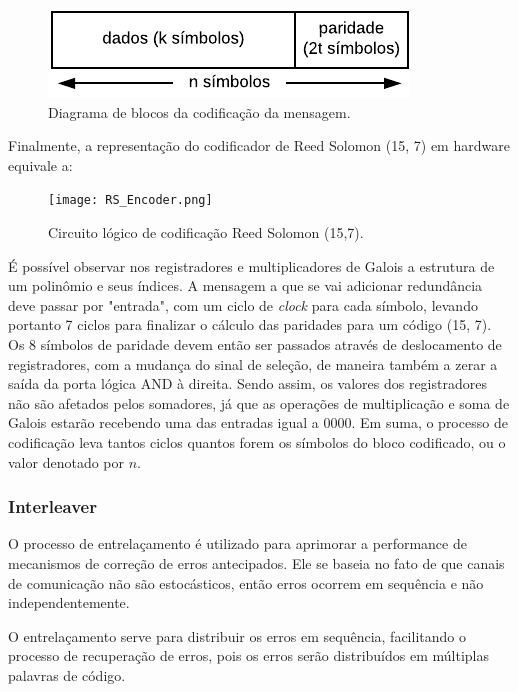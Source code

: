 	\begin{figure}[!htb]
		\caption{\label{fig_reed_solomon_message}Diagrama de blocos da codificação da mensagem.}
		\centering
		\includegraphics[width=0.4\textheight]{frame/rs-codeword.pdf}
	\end{figure}
	
	Finalmente, a representação do codificador de Reed Solomon (15, 7) em hardware equivale a:
	 
	\begin{figure}[!htb]
		\caption{\label{RS_encoder_logic}Circuito lógico de codificação Reed Solomon (15,7).}
		\centering
		\texttt{[image: RS\_Encoder.png]}
	\end{figure}

	É possível observar nos registradores e multiplicadores de Galois a estrutura de um polinômio e seus índices. A mensagem a que se vai adicionar redundância deve passar por "entrada", com um ciclo de \textit{clock} para cada símbolo, levando portanto 7 ciclos para finalizar o cálculo das paridades para um código (15, 7). Os 8 símbolos de paridade devem então ser passados através de deslocamento de registradores, com a mudança do sinal de seleção, de maneira também a zerar a saída da porta lógica AND à direita. Sendo assim, os valores dos registradores não são afetados pelos somadores, já que as operações de multiplicação e soma de Galois estarão recebendo uma das entradas igual a 0000. Em suma, o processo de codificação leva tantos ciclos quantos forem os símbolos do bloco codificado, ou o valor denotado por $n$.
	

	\subsubsection{Interleaver}
	
	O processo de entrelaçamento é utilizado para aprimorar a performance de mecanismos de correção de erros antecipados. Ele se baseia no fato de que canais de comunicação não são estocásticos, então erros ocorrem em sequência e não independentemente. 
	
	O entrelaçamento serve para distribuir os erros em sequência, facilitando o processo de recuperação de erros, pois os erros serão distribuídos em múltiplas palavras de código. 
	
